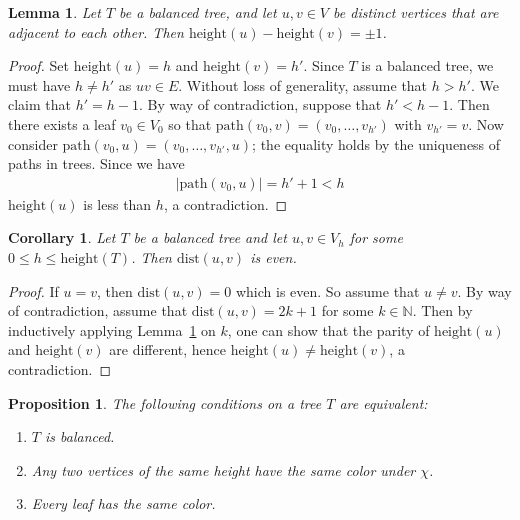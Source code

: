 \documentclass[12pt, reqno]{amsart}
\theoremstyle{definition}
\theoremstyle{plain}
\newtheorem{lemma}[theorem]{Lemma}
\newtheorem{corollary}[theorem]{Corollary}
\newtheorem{proposition}[theorem]{Proposition}
\theoremstyle{definition}
\newcommand{\dist}{\text{dist}}
\newcommand{\pth}{\mbox{path}}
\newcommand{\hh}{\mbox{height}}
\begin{document}
\begin{lemma}\label{lem. adjacent, then height differ by 1}
    Let $T$ be a balanced tree, and let $u,v \in V$ be distinct vertices that are adjacent to each other.
    Then $\hh(u) - \hh(v) = \pm 1$.
\end{lemma}

\begin{proof}
    Set $\hh(u) = h$ and $\hh(v) = h'$.
    Since $T$ is a balanced tree, we must have $h \neq h'$ as $uv \in E$.
    Without loss of generality, assume that $h > h'$.
    We claim that $h' = h - 1$.
    By way of contradiction, suppose that $h' < h - 1$.
    Then there exists a leaf $v_0 \in V_0$ so that $\pth(v_0,v) = (v_0,\dots,v_{h'})$ with $v_{h'} = v$.
    Now consider $\pth(v_0,u) = (v_0,\dots,v_{h'},u)$; the equality holds by the uniqueness of paths in trees.
    Since we have
    \begin{align*}
       |\pth(v_0,u)| = h'+1 < h 
    \end{align*}
    $\hh(u)$ is less than $h$, a contradiction.
\end{proof}

\begin{corollary}\label{cor. same hh -> odd dist}
    Let $T$ be a balanced tree and let $u,v \in V_h$ for some $0 \leq h \leq \hh(T)$.
    Then $\dist(u,v)$ is even.
\end{corollary}

\begin{proof}
    If $u = v$, then $\dist(u,v) = 0$ which is even.
    So assume that $u \neq v$.
    By way of contradiction, assume that $\dist(u,v) = 2k + 1$ for some $k \in \mathbb{N}$.
    Then by inductively applying Lemma~\ref{lem. adjacent, then height differ by 1} on $k$, one can show that the parity of $\hh(u)$ and $\hh(v)$ are different, hence $\hh(u) \neq \hh(v)$, a contradiction. 
\end{proof}

\begin{proposition}\label{prop. equiv. delt. tree}
The following conditions on a tree $T$ are equivalent:
\begin{enumerate}
	\item $T$ is balanced.
	\item Any two vertices of the same height have the same color under $\chi$.
	\item Every leaf has the same color.
\end{enumerate}
\end{proposition}
\end{document}
